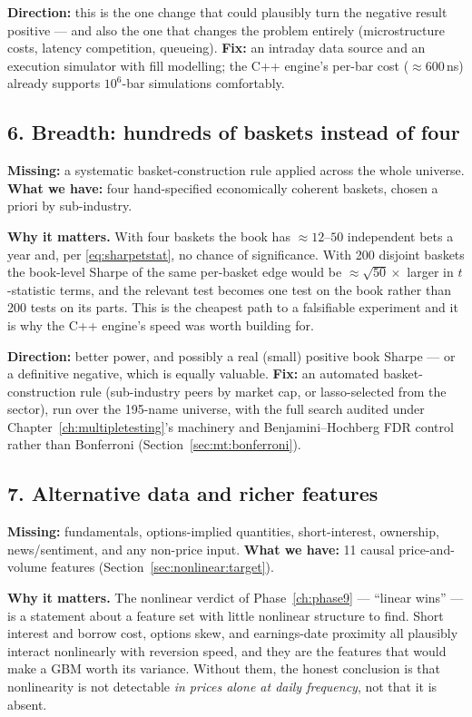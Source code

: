 \textbf{Direction:} this is the one change that could plausibly turn the negative result
positive --- and also the one that changes the problem entirely (microstructure costs,
latency competition, queueing). \textbf{Fix:} an intraday data source and an execution
simulator with fill modelling; the C++ engine's per-bar cost ($\approx600$\,ns) already
supports $10^6$-bar simulations comfortably.

\subsection{6. Breadth: hundreds of baskets instead of four}

\textbf{Missing:} a systematic basket-construction rule applied across the whole universe.
\textbf{What we have:} four hand-specified economically coherent baskets, chosen a priori by
sub-industry.

\textbf{Why it matters.} With four baskets the book has $\approx12$--$50$ independent bets a
year and, per \eqref{eq:sharpetstat}, no chance of significance. With 200 disjoint baskets
the book-level Sharpe of the same per-basket edge would be $\approx\sqrt{50}\times$ larger in
$t$-statistic terms, and the relevant test becomes one test on the book rather than 200 tests
on its parts. This is the cheapest path to a falsifiable experiment and it is why the C++
engine's speed was worth building for.

\textbf{Direction:} better power, and possibly a real (small) positive book Sharpe --- or a
definitive negative, which is equally valuable. \textbf{Fix:} an automated
basket-construction rule (sub-industry peers by market cap, or lasso-selected from the
sector), run over the 195-name universe, with the full search audited under
Chapter~\ref{ch:multipletesting}'s machinery and Benjamini--Hochberg FDR control rather than
Bonferroni (Section~\ref{sec:mt:bonferroni}).

\subsection{7. Alternative data and richer features}

\textbf{Missing:} fundamentals, options-implied quantities, short-interest, ownership,
news/sentiment, and any non-price input. \textbf{What we have:} 11 causal price-and-volume
features (Section~\ref{sec:nonlinear:target}).

\textbf{Why it matters.} The nonlinear verdict of Phase~\ref{ch:phase9} --- ``linear wins''
--- is a statement about a feature set with little nonlinear structure to find. Short
interest and borrow cost, options skew, and earnings-date proximity all plausibly interact
nonlinearly with reversion speed, and they are the features that would make a GBM worth its
variance. Without them, the honest conclusion is that nonlinearity is not detectable
\emph{in prices alone at daily frequency}, not that it is absent.

